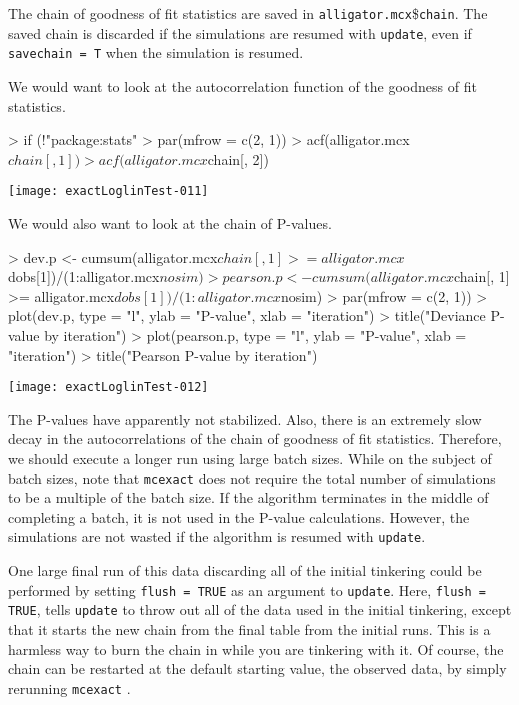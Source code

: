 \documentclass[a4paper]{article}
\newcommand{\mcexact}{\texttt{mcexact} }
\begin{document}
The chain of goodness of fit statistics are saved in
\texttt{alligator.mcx}\$\texttt{chain}. The saved chain is discarded
if the simulations are resumed with \texttt{update}, even if
\texttt{savechain = T} when the simulation is resumed.

We would want to look at the autocorrelation function of the goodness
of fit statistics.
\begin{center}
\begin{Schunk}
\begin{Sinput}
> if (!"package:stats" %in% search()) library(ts)
> par(mfrow = c(2, 1))
> acf(alligator.mcx$chain[, 1])
> acf(alligator.mcx$chain[, 2])
\end{Sinput}
\end{Schunk}
\texttt{[image: exactLoglinTest-011]}
\end{center}
We would also want to look at the chain of P-values. 
\begin{center}
\begin{Schunk}
\begin{Sinput}
> dev.p <- cumsum(alligator.mcx$chain[, 1] >= alligator.mcx$dobs[1])/(1:alligator.mcx$nosim)
> pearson.p <- cumsum(alligator.mcx$chain[, 1] >= alligator.mcx$dobs[1])/(1:alligator.mcx$nosim)
> par(mfrow = c(2, 1))
> plot(dev.p, type = "l", ylab = "P-value", xlab = "iteration")
> title("Deviance P-value by iteration")
> plot(pearson.p, type = "l", ylab = "P-value", xlab = "iteration")
> title("Pearson P-value by iteration")
\end{Sinput}
\end{Schunk}
\texttt{[image: exactLoglinTest-012]}
\end{center}

The P-values have apparently not stabilized. Also, there is an
extremely slow decay in the autocorrelations of the chain of goodness
of fit statistics. Therefore, we should execute a longer run using
large batch sizes. While on the subject of batch sizes, note that
\mcexact does not require the total number of simulations to be a
multiple of the batch size. If the algorithm terminates in the middle
of completing a batch, it is not used in the P-value
calculations. However, the simulations are not wasted if the algorithm
is resumed with \texttt{update}.

One large final run of this data discarding all of the initial
tinkering could be performed by setting \texttt{flush = TRUE} as an
argument to \texttt{update}.  Here, \texttt{flush = TRUE}, tells
\texttt{update} to throw out all of the data used in the initial
tinkering, except that it starts the new chain from the final table
from the initial runs. This is a harmless way to burn the chain in
while you are tinkering with it.  Of course, the chain can be
restarted at the default starting value, the observed data, by simply
rerunning \mcexact.
\end{document}
